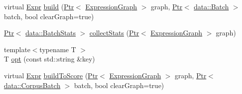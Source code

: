 \begin{DoxyCompactItemize}
\item 
virtual \hyperlink{namespacemarian_a498d8baf75b754011078b890b39c8e12}{Expr} \hyperlink{classmarian_1_1EncoderDecoder_a689c60d4a1c79e4d5e4e57a6d947e535}{build} (\hyperlink{namespacemarian_ad1a373be43a00ef9ce35666145137b08}{Ptr}$<$ \hyperlink{classmarian_1_1ExpressionGraph}{Expression\+Graph} $>$ graph, \hyperlink{namespacemarian_ad1a373be43a00ef9ce35666145137b08}{Ptr}$<$ \hyperlink{classmarian_1_1data_1_1Batch}{data\+::\+Batch} $>$ batch, bool clear\+Graph=true)
\item 
\hyperlink{namespacemarian_ad1a373be43a00ef9ce35666145137b08}{Ptr}$<$ \hyperlink{classmarian_1_1data_1_1BatchStats}{data\+::\+Batch\+Stats} $>$ \hyperlink{classmarian_1_1EncoderDecoder_aa2e6bff207c6bc17206115ff44a22fe5}{collect\+Stats} (\hyperlink{namespacemarian_ad1a373be43a00ef9ce35666145137b08}{Ptr}$<$ \hyperlink{classmarian_1_1ExpressionGraph}{Expression\+Graph} $>$ graph)
\item 
{\footnotesize template$<$typename T $>$ }\\T \hyperlink{classmarian_1_1EncoderDecoder_a85f3edf6aa54eadf41871f0a9fa3311e}{opt} (const std\+::string \&key)
\item 
virtual \hyperlink{namespacemarian_a498d8baf75b754011078b890b39c8e12}{Expr} \hyperlink{classmarian_1_1EncoderDecoder_a3a4c9f318d7d21fc4b9eead88a09798b}{build\+To\+Score} (\hyperlink{namespacemarian_ad1a373be43a00ef9ce35666145137b08}{Ptr}$<$ \hyperlink{classmarian_1_1ExpressionGraph}{Expression\+Graph} $>$ graph, \hyperlink{namespacemarian_ad1a373be43a00ef9ce35666145137b08}{Ptr}$<$ \hyperlink{classmarian_1_1data_1_1CorpusBatch}{data\+::\+Corpus\+Batch} $>$ batch, bool clear\+Graph=true)
\end{DoxyCompactItemize}
